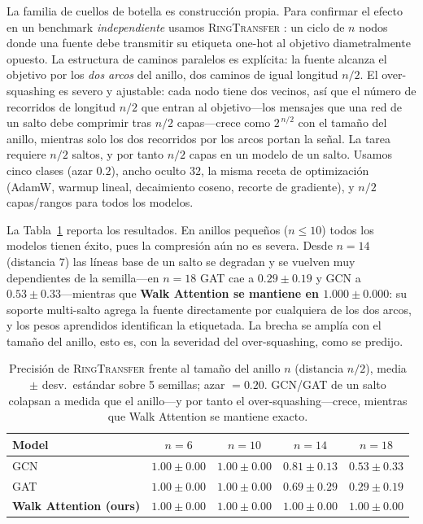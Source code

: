 La familia de cuellos de botella es construcción propia. Para confirmar el efecto
en un benchmark \emph{independiente} usamos \textsc{RingTransfer}
\cite{digiovanni2023oversquashing}: un ciclo de $n$ nodos donde una fuente debe
transmitir su etiqueta one-hot al objetivo diametralmente opuesto. La estructura de
caminos paralelos es explícita: la fuente alcanza el objetivo por los \emph{dos arcos}
del anillo, dos caminos de igual longitud $n/2$. El over-squashing es severo y
ajustable: cada nodo tiene dos vecinos, así que el número de recorridos de
longitud $n/2$ que entran al objetivo---los mensajes que una red de un salto debe
comprimir tras $n/2$ capas---crece como $2^{\,n/2}$ con el tamaño del anillo,
mientras solo los dos recorridos por los arcos portan la señal. La tarea requiere
$n/2$ saltos, y por tanto $n/2$ capas en un modelo de un salto. Usamos cinco
clases (azar $0.2$), ancho oculto $32$, la misma receta de optimización (AdamW,
warmup lineal, decaimiento coseno, recorte de gradiente), y $n/2$ capas/rangos
para todos los modelos.

La Tabla~\ref{tab:ring} reporta los resultados. En anillos pequeños
($n\le 10$) todos los modelos tienen éxito, pues la compresión aún no es severa.
Desde $n=14$ (distancia $7$) las líneas base de un salto se degradan y se vuelven
muy dependientes de la semilla---en $n=18$ GAT cae a $0.29\pm0.19$ y GCN a
$0.53\pm0.33$---mientras que \textbf{Walk Attention se mantiene en
$1.000\pm0.000$}: su soporte multi-salto agrega la fuente directamente por
cualquiera de los dos arcos, y los pesos aprendidos identifican la etiquetada.
La brecha se amplía con el tamaño del anillo, esto es, con la severidad del
over-squashing, como se predijo.

\begin{table}[t]
\centering
\caption{Precisión de \textsc{RingTransfer} frente al tamaño del anillo $n$
(distancia $n/2$), media $\pm$ desv.\ estándar sobre 5 semillas; azar $=0.20$.
GCN/GAT de un salto colapsan a medida que el anillo---y por tanto el
over-squashing---crece, mientras que Walk Attention se mantiene exacto.}
\label{tab:ring}
\begin{tabular}{lcccc}
\toprule
\textbf{Model} & $n{=}6$ & $n{=}10$ & $n{=}14$ & $n{=}18$ \\
\midrule
GCN                    & $1.00\pm0.00$ & $1.00\pm0.00$ & $0.81\pm0.13$ & $0.53\pm0.33$ \\
GAT                    & $1.00\pm0.00$ & $1.00\pm0.00$ & $0.69\pm0.29$ & $0.29\pm0.19$ \\
\textbf{Walk Attention (ours)} & $\mathbf{1.00\pm0.00}$ & $\mathbf{1.00\pm0.00}$ & $\mathbf{1.00\pm0.00}$ & $\mathbf{1.00\pm0.00}$ \\
\bottomrule
\end{tabular}
\end{table}

